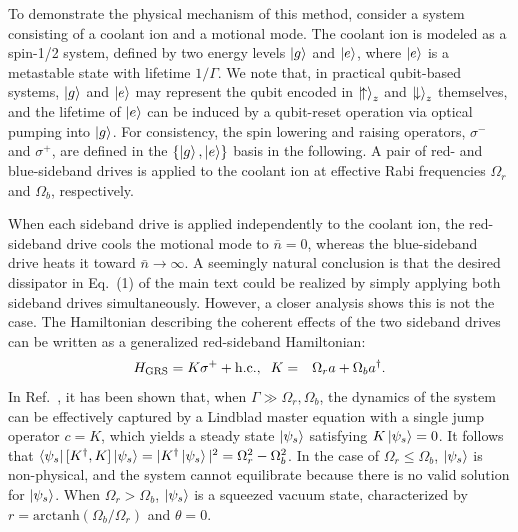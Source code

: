 \documentclass[
reprint,
superscriptaddress,

amsmath,amssymb,
aps,
prl,

floatfix,
]{revtex4-2}
\begin{document}
To demonstrate the physical mechanism of this method, consider a system consisting of a coolant ion and a motional mode. The coolant ion is modeled as a spin-1/2 system, defined by two energy levels $\ket{g}$ and $\ket{e}$, where $\ket{e}$ is a metastable state with lifetime $1/\Gamma$. We note that, in practical qubit-based systems, $\ket{g}$ and $\ket{e}$ may represent the qubit encoded in $\ket{\!\uparrow}_z$ and $\ket{\!\downarrow}_z$ themselves, and the lifetime of $\ket{e}$ can be induced by a qubit-reset operation via optical pumping into $\ket{g}$. For consistency, the spin lowering and raising operators, $\sigma^-$ and $\sigma^+$, are defined in the $\{\ket{g},\ket{e}\}$ basis in the following. A pair of red- and blue-sideband drives is applied to the coolant ion at effective Rabi frequencies $\Omega_r$ and $\Omega_b$, respectively.

When each sideband drive is applied independently to the coolant ion, the red-sideband drive cools the motional mode to $\bar{n}=0$, whereas the blue-sideband drive heats it toward $\bar{n}\to\infty$. A seemingly natural conclusion is that the desired dissipator in Eq.~(1)
of the main text \cite{so2025fT} could be realized by simply applying both sideband drives simultaneously. However, a closer analysis shows this is not the case. The Hamiltonian describing the coherent effects of the two sideband drives can be written as a generalized red-sideband Hamiltonian:
\begin{eqnarray}
    H_{\rm GRS}= K\sigma^++{\rm h.c.},\;\;K&=&\Omega_ra+\Omega_ba^\dagger.
\end{eqnarray}
In Ref.~\cite{kienzler2015thesis}, it has been shown that, when $\Gamma\gg\Omega_r,\Omega_b$, the dynamics of the system can be effectively captured by a Lindblad master equation with a single jump operator $c=K$, which yields a steady state $\ket{\psi_s}$ satisfying $K\ket{\psi_s}=0$. It follows that $\bra{\psi_s}[K^\dagger,K]\ket{\psi_s}=|K^\dagger \ket{\psi_s}|^2=\Omega_r^2-\Omega_b^2$. In the case of $\Omega_r\leq\Omega_b$, $\ket{\psi_s}$ is non-physical, and the system cannot equilibrate because there is no valid solution for $\ket{\psi_s}$. When $\Omega_r>\Omega_b $, $\ket{\psi_s}$ is a squeezed vacuum state, characterized by $r=\text{arctanh}(\Omega_b/\Omega_r)$ and $\theta=0$.
\end{document}

